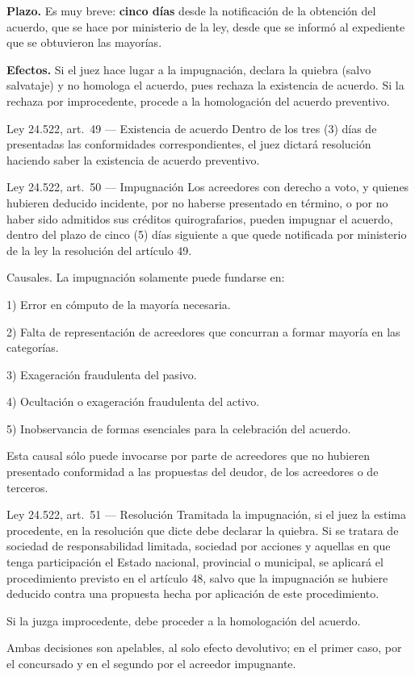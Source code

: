 \documentclass[12pt,oneside]{book}
\begin{document}
\textbf{Plazo.} Es muy breve: \textbf{cinco días} desde la notificación de la obtención del acuerdo, que se hace por ministerio de la ley, desde que se informó al expediente que se obtuvieron las mayorías.

\textbf{Efectos.} Si el juez hace lugar a la impugnación, declara la quiebra (salvo salvataje) y no homologa el acuerdo, pues rechaza la existencia de acuerdo. Si la rechaza por improcedente, procede a la homologación del acuerdo preventivo.

\begin{norma}{Ley 24.522, art.\ 49 --- Existencia de acuerdo}
Dentro de los tres (3) días de presentadas las conformidades correspondientes, el juez dictará resolución haciendo saber la existencia de acuerdo preventivo.
\end{norma}

\begin{norma}{Ley 24.522, art.\ 50 --- Impugnación}
Los acreedores con derecho a voto, y quienes hubieren deducido incidente, por no haberse presentado en término, o por no haber sido admitidos sus créditos quirografarios, pueden impugnar el acuerdo, dentro del plazo de cinco (5) días siguiente a que quede notificada por ministerio de la ley la resolución del artículo 49.

Causales. La impugnación solamente puede fundarse en:

1) Error en cómputo de la mayoría necesaria.

2) Falta de representación de acreedores que concurran a formar mayoría en las categorías.

3) Exageración fraudulenta del pasivo.

4) Ocultación o exageración fraudulenta del activo.

5) Inobservancia de formas esenciales para la celebración del acuerdo.

Esta causal sólo puede invocarse por parte de acreedores que no hubieren presentado conformidad a las propuestas del deudor, de los acreedores o de terceros.
\end{norma}

\begin{norma}{Ley 24.522, art.\ 51 --- Resolución}
Tramitada la impugnación, si el juez la estima procedente, en la resolución que dicte debe declarar la quiebra. Si se tratara de sociedad de responsabilidad limitada, sociedad por acciones y aquellas en que tenga participación el Estado nacional, provincial o municipal, se aplicará el procedimiento previsto en el artículo 48, salvo que la impugnación se hubiere deducido contra una propuesta hecha por aplicación de este procedimiento.

Si la juzga improcedente, debe proceder a la homologación del acuerdo.

Ambas decisiones son apelables, al solo efecto devolutivo; en el primer caso, por el concursado y en el segundo por el acreedor impugnante.
\end{norma}
\end{document}
